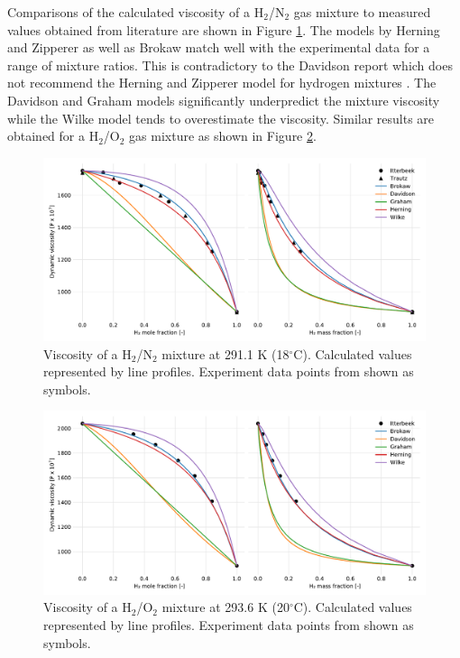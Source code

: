 Comparisons of the calculated viscosity of a H$_2$/N$_2$ gas mixture to measured values obtained from literature are shown in Figure \ref{fig:gas-mu-h2n2-validate}. The models by Herning and Zipperer as well as Brokaw match well with the experimental data for a range of mixture ratios. This is contradictory to the Davidson report which does not recommend the Herning and Zipperer model for hydrogen mixtures \cite{Davidson-1993}. The Davidson and Graham models significantly underpredict the mixture viscosity while the Wilke model tends to overestimate the viscosity. Similar results are obtained for a H$_2$/O$_2$ gas mixture as shown in Figure \ref{fig:gas-mu-h2o2-validate}.

\begin{figure}[H]
    \centering
    \includegraphics[width=\textwidth]{figures/gas-mu-h2n2-validate.pdf}
    \caption{Viscosity of a H$_2$/N$_2$ mixture at 291.1 K (18$^\circ$C). Calculated values represented by line profiles. Experiment data points from \cite{Itterbeek-1947,Trautz-1929} shown as symbols.}
    \label{fig:gas-mu-h2n2-validate}
\end{figure}

\begin{figure}[H]
    \centering
    \includegraphics[width=\textwidth]{figures/gas-mu-h2o2-validate.pdf}
    \caption{Viscosity of a H$_2$/O$_2$ mixture at 293.6 K (20$^\circ$C). Calculated values represented by line profiles. Experiment data points from \cite{Itterbeek-1947} shown as symbols.}
    \label{fig:gas-mu-h2o2-validate}
\end{figure}

